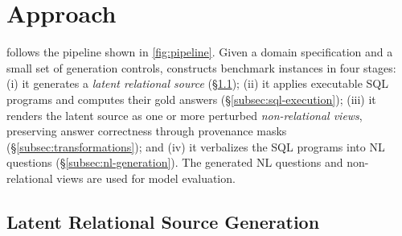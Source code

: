 \section{Approach}
\label{sec:approach}

\name follows the pipeline shown in \autoref{fig:pipeline}. Given a domain specification and a small set of generation controls, \name constructs benchmark instances in four stages: 
(i) it generates a \emph{latent relational source} (\S\ref{subsec:data-generation}); 
(ii) it applies executable SQL programs and computes their gold answers (\S\ref{subsec:sql-execution}); 
(iii) it renders the latent source as one or more perturbed \emph{non-relational views}, preserving answer correctness through provenance masks (\S\ref{subsec:transformations});
and (iv) it verbalizes the SQL programs into NL questions (\S\ref{subsec:nl-generation}). The generated NL questions and non-relational views are used for model evaluation.

\subsection{Latent Relational Source Generation}
\label{subsec:data-generation}



